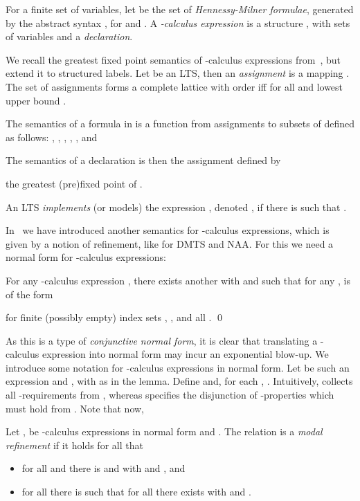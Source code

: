 \documentclass[twocolumn]{svjour3-dummy}
\newcommand*\NAA{NAA\xspace}
\newcommand*\noproof{\qed}
\begin{document}
For a finite set  of variables, let  be the set of
\emph{Hennessy-Milner formulae}, generated by the abstract syntax , for  and
.  A \emph{-calculus expression} is a structure , with  sets of variables and  a \emph{declaration}.

We recall the greatest fixed point semantics of -calculus
expressions from~\cite{DBLP:journals/tcs/Larsen90}, but extend it to
structured labels.  Let  be an LTS, then an
\emph{assignment} is a mapping .  The set of
assignments forms a complete lattice with order  iff  for all  and
lowest upper bound .

The semantics of a formula in  is a function from
assignments to subsets of  defined as follows: , , ,
, , and
 
The semantics of a declaration  is then the assignment defined
by

the greatest (pre)fixed point of .

An LTS  \emph{implements} (or models) the
expression , denoted , if there is 
such that .

In~\cite{DBLP:conf/ictac/FahrenbergLT14} we have introduced another
semantics for -calculus expressions, which is given by a notion of
refinement, like for DMTS and \NAA.  For this we need a normal form for
-calculus expressions:

\begin{lemma}
  \label{le:hmlnormal}
  For any -calculus expression ,
  there exists another  with
   and such that for any ,
   is of the form
  
  for finite (possibly empty) index sets , ,  and all .  \noproof
\end{lemma}

As this is a type of \emph{conjunctive normal form}, it is clear that
translating a -calculus expression into normal form may incur an
exponential blow-up.
We introduce some notation for -calculus expressions in normal
form.  Let  be such an expression and ,
with  as in the lemma.  Define  and, for each
, .  Intuitively,
 collects all -requirements from ,
whereas  specifies the disjunction of -properties
which must hold from .  Note that now,


Let ,  be
-calculus expressions in normal form and .  The relation  is a \emph{modal refinement} if it holds for all
 that
\begin{itemize}
\item for all  and  there is
   and  with  and , and
\item for all  there is  such that for all  there exists
   with  and .
\end{itemize}
\end{document}
